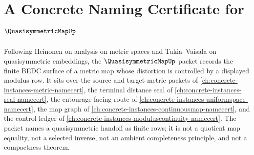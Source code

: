 \chapter{A Concrete Naming Certificate for $\QuasisymmetricMapUp$}
\label{ch:concrete-instances-quasisymmetric-map-namecert}

Following Heinonen on analysis on metric spaces and Tukia--Vaisala on quasisymmetric embeddings, the $\QuasisymmetricMapUp$ packet records the finite BEDC surface of a metric map whose distortion is controlled by a displayed modulus row. It sits over the source and target metric packets of \autoref{ch:concrete-instances-metric-namecert}, the terminal distance seal of \autoref{ch:concrete-instances-real-namecert}, the entourage-facing route of \autoref{ch:concrete-instances-uniformspace-namecert}, the map graph of \autoref{ch:concrete-instances-continuousmap-namecert}, and the control ledger of \autoref{ch:concrete-instances-moduluscontinuity-namecert}. The packet names a quasisymmetric handoff as finite rows; it is not a quotient map equality, not a selected inverse, not an ambient completeness principle, and not a compactness theorem.

